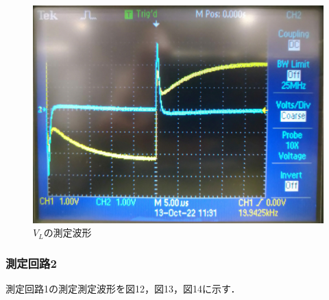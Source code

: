   \begin{figure}[H]
    \begin{center}
        \includegraphics[keepaspectratio, scale=0.3]{DSC_0237.pdf}
        \caption{$V_L$の測定波形}
    \end{center}
\end{figure}

\newpage

\subsubsection{測定回路2}
測定回路1の測定測定波形を図12，図13，図14に示す．

